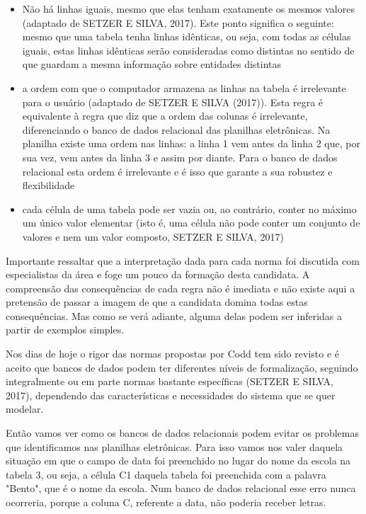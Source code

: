 \begin{itemize}
\item Não há linhas iguais, mesmo que elas tenham exatamente os mesmos valores  (adaptado de SETZER E SILVA, 2017). Este ponto significa o seguinte: mesmo que uma tabela tenha linhas idênticas, ou seja, com todas as células iguais, estas linhas idênticas serão consideradas como distintas no sentido de que guardam a mesma informação sobre entidades distintas
\item a ordem com que o computador armazena as linhas na tabela é irrelevante para o usuário  (adaptado de SETZER E SILVA (2017)). Esta regra é equivalente à regra que diz que a ordem das colunas é irrelevante, diferenciando o banco de dados relacional das planilhas eletrônicas. Na planilha existe uma ordem nas linhas: a linha 1 vem antes da linha 2 que, por sua vez, vem antes da linha 3 e assim por diante. Para o banco de dados relacional esta ordem é irrelevante e é isso que garante a sua robustez e flexibilidade
\item cada célula de uma tabela pode ser vazia ou, ao contrário, conter no máximo um único valor elementar (isto é, uma célula não pode conter um conjunto de valores e nem um valor composto, SETZER E SILVA, 2017)
\end{itemize}

Importante ressaltar que a interpretação dada para cada norma foi discutida com especialistas da área e foge um pouco da formação desta candidata. A compreensão das consequências de cada regra não é imediata e não existe aqui a pretensão de passar a imagem de que a candidata domina todas estas consequências. Mas como se verá adiante, alguma delas podem ser inferidas a partir de exemplos simples.

Nos dias de hoje o rigor das normas propostas por Codd tem sido revisto e é aceito que bancos de dados podem ter diferentes níveis de formalização, seguindo integralmente ou em parte normas bastante específicas (SETZER E SILVA, 2017), dependendo das características e necessidades do sistema que se quer modelar.

Então vamos ver como os bancos de dados relacionais podem evitar os problemas que identificamos nas planilhas eletrônicas. Para isso vamos nos valer daquela situação em que o campo de data foi preenchido no lugar do nome da escola na tabela 3, ou seja, a célula C1 daquela tabela foi preenchida com a palavra "Bento", que é o nome da escola. Num banco de dados relacional esse erro nunca ocorreria, porque a coluna C, referente a data, não poderia receber letras.

